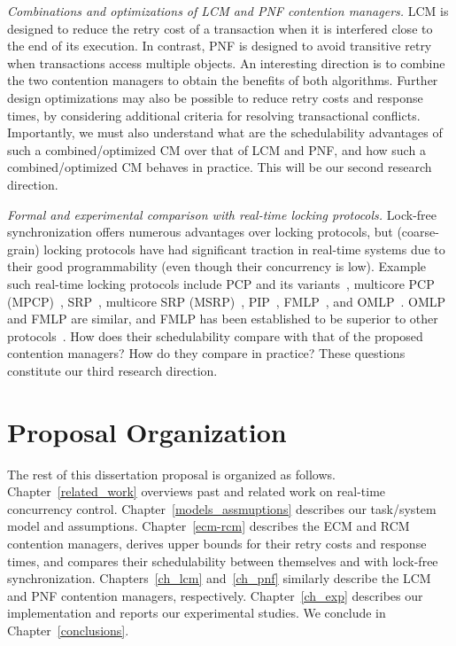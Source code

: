 \documentclass[12pt,english]{report}
\begin{document}
\textit{Combinations and optimizations of LCM and PNF contention managers.} LCM is designed to reduce the retry cost of a transaction when it is interfered close to the end of its execution. In contrast, PNF is designed to avoid transitive retry when transactions access multiple objects. An interesting direction is to combine the two contention managers to obtain the benefits of both algorithms. Further design optimizations may also be possible to reduce retry costs and response times, by considering additional criteria for resolving transactional conflicts. Importantly, we must also understand what are the schedulability advantages of such a combined/optimized CM over that of LCM and PNF, and how such a combined/optimized CM behaves in practice. This will be our second research direction. 

\textit{Formal and experimental comparison with real-time locking protocols.} Lock-free synchronization offers numerous advantages over locking protocols, but (coarse-grain) locking protocols have had significant traction in real-time systems due to their good programmability (even though their concurrency is low).  Example such real-time locking protocols include PCP and its variants~\cite{chen1990dynamic,6031129,Rajkumar:1991:SRS:532621,sha1990priority}, multicore PCP (MPCP)~\cite{lakshmanan2009coordinated,rajkumar2002real}, SRP~\cite{Buttazzo:2004:HRC:1027504, baker1991stack}, multicore SRP (MSRP)~\cite{gai2003comparison}, PIP~\cite{easwaran2009resource}, FMLP~\cite{key-4,brandenburg2008implementation,holman2006locking}, and OMLP~\cite{Baruah:2007:TMG:1338441.1338647}. OMLP and FMLP are similar, and FMLP has been established to be superior to other protocols~\cite{brandenburg2008comparison}. How does their schedulability compare with that of the proposed contention managers? How do they compare in practice? These questions constitute our third research direction. 


\section{\label{sec:proposal outline}Proposal Organization}

The rest of this dissertation proposal is organized as follows. Chapter~\ref{related_work} overviews past and related work on  real-time concurrency control. Chapter~\ref{models_assmuptions} describes our task/system model and assumptions.   Chapter~\ref{ecm-rcm} describes the ECM and RCM contention managers, derives upper bounds for their retry costs and response times, and compares their schedulability between themselves and with lock-free synchronization. Chapters~\ref{ch_lcm} and~\ref{ch_pnf} similarly describe the LCM and PNF contention managers, respectively. Chapter~\ref{ch_exp} describes our implementation and reports our experimental studies. We conclude in Chapter~\ref{conclusions}.
\end{document}
